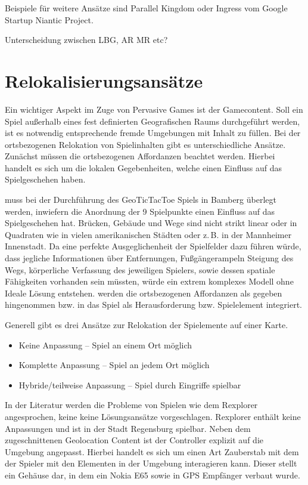 Beispiele für weitere Ansätze sind Parallel Kingdom oder Ingress vom Google Startup Niantic Project.

Unterscheidung zwischen LBG, AR MR etc?

\section{Relokalisierungsansätze}
\label{ch3:s:Relokalisierung}

Ein wichtiger Aspekt im Zuge von Pervasive Games ist der Gamecontent. Soll ein Spiel außerhalb eines fest definierten Geografischen Raums durchgeführt werden, ist es notwendig entsprechende fremde Umgebungen mit Inhalt zu füllen. \cite{Montola.2005} 
Bei der ortsbezogenen Relokation von Spielinhalten gibt es unterschiedliche Ansätze.
Zunächst müssen die ortsbezogenen Affordanzen beachtet werden. Hierbei handelt es sich um die lokalen Gegebenheiten, welche einen Einfluss auf das Spielgeschehen haben.

muss bei der Durchführung des GeoTicTacToe Spiels in Bamberg überlegt werden, inwiefern die Anordnung der 9 Spielpunkte einen Einfluss auf das Spielgeschehen hat. Brücken, Gebäude und Wege sind nicht strikt linear oder in Quadraten wie in vielen amerikanischen Städten oder z.\,B. in der Mannheimer Innenstadt. Da eine perfekte Ausgeglichenheit der Spielfelder dazu führen würde, dass jegliche Informationen über Entfernungen, Fußgängerampeln Steigung des Wegs, körperliche Verfassung des jeweiligen Spielers, sowie dessen spatiale Fähigkeiten vorhanden sein müssten, würde ein extrem komplexes Modell ohne Ideale Lösung entstehen. werden die ortsbezogenen Affordanzen als gegeben hingenommen bzw. in das Spiel als Herausforderung bzw. Spielelement integriert.

Generell gibt es drei Ansätze zur Relokation der Spielemente auf einer Karte.

\begin{itemize}
\item Keine Anpassung -- Spiel an einem Ort möglich
\item Komplette Anpassung -- Spiel an jedem Ort möglich
\item Hybride/teilweise Anpassung -- Spiel durch Eingriffe spielbar
\end{itemize}

In der Literatur werden die Probleme von Spielen wie dem Rexplorer\cite{Ballagas.2007} angesprochen, keine keine Lösungsansätze vorgeschlagen. Rexplorer enthält keine Anpassungen und ist in der Stadt Regensburg spielbar. Neben dem zugeschnittenen Geolocation Content ist der Controller explizit auf die Umgebung angepasst.
Hierbei handelt es sich um einen Art Zauberstab mit dem der Spieler mit den Elementen in der Umgebung interagieren kann. Dieser stellt ein Gehäuse dar, in dem ein Nokia E65 sowie in GPS Empfänger verbaut wurde.


